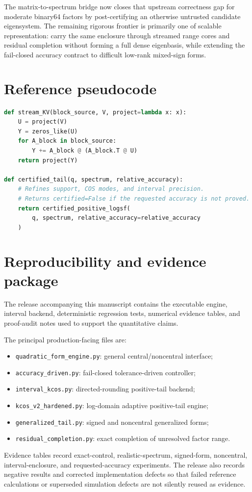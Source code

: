 \documentclass[11pt]{article}
\theoremstyle{definition}
\theoremstyle{remark}
\begin{document}
The matrix-to-spectrum bridge now closes that upstream correctness gap for
moderate binary64 factors by post-certifying an otherwise untrusted candidate
eigensystem.  The remaining rigorous frontier is primarily one of scalable
representation: carry the same enclosure through streamed range cores and
residual completion without forming a full dense eigenbasis, while extending
the fail-closed accuracy contract to difficult low-rank mixed-sign forms.


\appendix

\section{Reference pseudocode}

\begin{lstlisting}[language=Python]
def stream_KV(block_source, V, project=lambda x: x):
    U = project(V)
    Y = zeros_like(U)
    for A_block in block_source:
        Y += A_block @ (A_block.T @ U)
    return project(Y)

def certified_tail(q, spectrum, relative_accuracy):
    # Refines support, COS modes, and interval precision.
    # Returns certified=False if the requested accuracy is not proved.
    return certified_positive_logsf(
        q, spectrum, relative_accuracy=relative_accuracy
    )
\end{lstlisting}

\section{Reproducibility and evidence package}

The release accompanying this manuscript contains the executable engine,
interval backend, deterministic regression tests, numerical evidence tables,
and proof-audit notes used to support the quantitative claims.

The principal production-facing files are:

\begin{itemize}
\item \texttt{quadratic\_form\_engine.py}: general central/noncentral interface;
\item \texttt{accuracy\_driven.py}: fail-closed tolerance-driven controller;
\item \texttt{interval\_kcos.py}: directed-rounding positive-tail backend;
\item \texttt{kcos\_v2\_hardened.py}: log-domain adaptive positive-tail engine;
\item \texttt{generalized\_tail.py}: signed and noncentral generalized forms;
\item \texttt{residual\_completion.py}: exact completion of unresolved factor
range.
\end{itemize}

Evidence tables record exact-control, realistic-spectrum, signed-form,
noncentral, interval-enclosure, and requested-accuracy experiments.  The
release also records negative results and corrected implementation defects so
that failed reference calculations or superseded simulation defects are not
silently reused as evidence.
\end{document}
